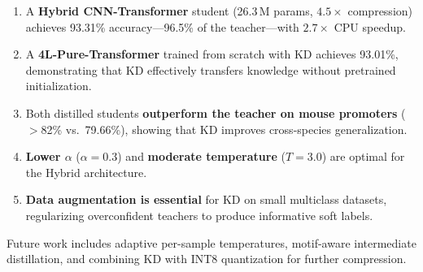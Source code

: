 \documentclass[conference]{IEEEtran}
\begin{document}
\begin{enumerate}
    \item A \textbf{Hybrid CNN-Transformer} student (26.3\,M params, $4.5\times$ compression) achieves 93.31\% accuracy---96.5\% of the teacher---with $2.7\times$ CPU speedup.
    \item A \textbf{4L-Pure-Transformer} trained from scratch with KD achieves 93.01\%, demonstrating that KD effectively transfers knowledge without pretrained initialization.
    \item Both distilled students \textbf{outperform the teacher on mouse promoters} ($>$82\% vs.\ 79.66\%), showing that KD improves cross-species generalization.
    \item \textbf{Lower $\alpha$} ($\alpha\!=\!0.3$) and \textbf{moderate temperature} ($T\!=\!3.0$) are optimal for the Hybrid architecture.
    \item \textbf{Data augmentation is essential} for KD on small multiclass datasets, regularizing overconfident teachers to produce informative soft labels.
\end{enumerate}

Future work includes adaptive per-sample temperatures, motif-aware intermediate distillation, and combining KD with INT8 quantization for further compression.
\end{document}
